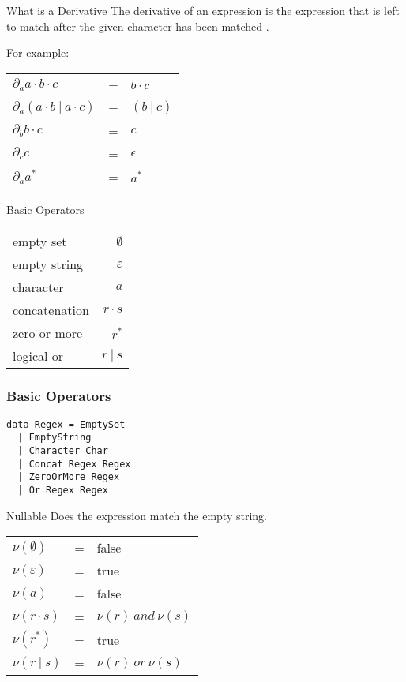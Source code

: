 \documentclass[10pt]{beamer}
\begin{document}
\begin{frame}{What is a Derivative}
The derivative of an expression is the expression that is left to match after the given character has been matched
\cite{brzozowski1964derivatives}.

For example:

\begin{center}
\begin{tabular}{lll}
$\partial_a a \cdot b \cdot c$ & = & $b \cdot c$ \\
$\partial_a (a \cdot b\ |\ a \cdot c)$ & = & $(b\ |\ c)$ \\
$\partial_b b \cdot c$ & = & $c$ \\
$\partial_c c$ & = & $\epsilon$ \\
$\partial_a a^{*}$ & = & $a^{*}$ \\
\end{tabular}
\end{center}

\end{frame}

\begin{frame}{Basic Operators}
\begin{center}
\begin{tabular}{l|r}
empty set & $\emptyset$ \\
empty string & $\varepsilon$ \\
character & $a$ \\
concatenation & $r \cdot s$ \\
zero or more & $r^*$ \\
logical or & $r\ |\ s$ \\
\end{tabular}
\end{center}
\end{frame}

\begin{frame}[fragile]
\frametitle{Basic Operators}
\begin{center}
\begin{verbatim}
data Regex = EmptySet
  | EmptyString
  | Character Char
  | Concat Regex Regex
  | ZeroOrMore Regex
  | Or Regex Regex
\end{verbatim}
\end{center}
\end{frame}

\begin{frame}[fragile]{Nullable}
Does the expression match the empty string.
\begin{center}
\begin{tabular}{l c l}
$\nu(\emptyset)$ & = & false\\
$\nu(\varepsilon)$ & = & true\\
$\nu(a)$ & = & false\\
$\nu(r \cdot s)$ & = & $\nu(r)\ and\ \nu(s)$ \\
$\nu(r^{*})$ & = & true \\
$\nu(r\ |\ s)$ & = & $\nu(r)\ or\ \nu(s)$ \\
\end{tabular}
\end{center}
\end{frame}
\end{document}
